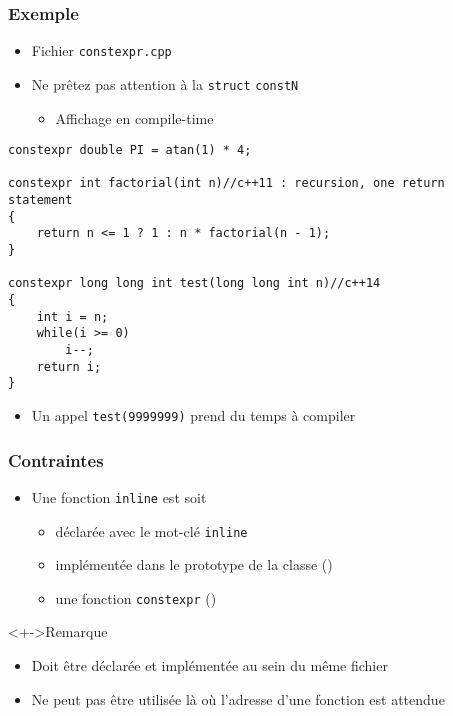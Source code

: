 \begin{frame}[containsverbatim]
\frametitle{Exemple}
\begin{itemize}
\item Fichier \texttt{constexpr.cpp}
\item Ne prêtez pas attention à la \lstinline|struct| \texttt{constN}
	\begin{itemize}
	\item Affichage en compile-time
	\end{itemize}
\end{itemize}
\begin{lstlisting}
constexpr double PI = atan(1) * 4;

constexpr int factorial(int n)//c++11 : recursion, one return statement
{
    return n <= 1 ? 1 : n * factorial(n - 1);
}

constexpr long long int test(long long int n)//c++14
{
	int i = n;
	while(i >= 0)
		i--;
	return i;
}
\end{lstlisting}
\begin{itemize}
\item Un appel \texttt{test(9999999)} prend du temps à compiler
\end{itemize}
\end{frame}

\begin{frame}
\frametitle{Contraintes}
\begin{itemize}[<+->]
\item Une fonction \lstinline|inline| est soit
	\begin{itemize}
	\item déclarée avec le mot-clé \lstinline|inline|
	\item implémentée dans le prototype de la classe (\cpp)
	\item une fonction \lstinline|constexpr| (\cpp)
	\end{itemize}
\end{itemize}
\begin{alertblock}<+->{Remarque}
	\begin{itemize}[<+->]
	\item Doit être déclarée et implémentée au sein du même fichier
	\item Ne peut pas être utilisée là où l'adresse d'une fonction est attendue
	\end{itemize}
\end{alertblock}
\end{frame}

